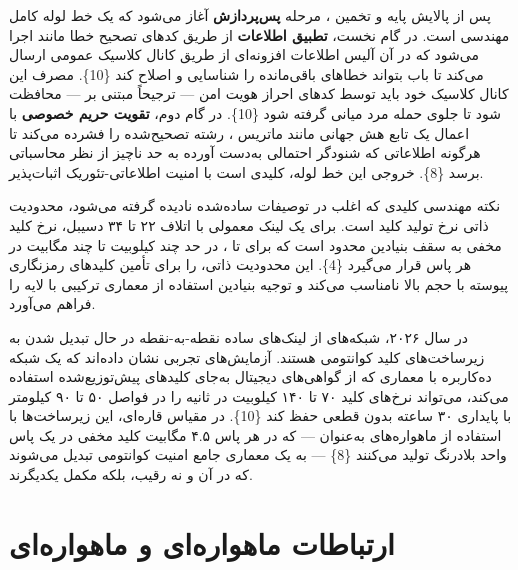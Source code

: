 \documentclass[a4paper,14pt]{extreport}
\begin{document}
پس از پالایش پایه و تخمین ، مرحله \textbf{پس‌پردازش}  آغاز می‌شود که یک خط لوله کامل مهندسی است. در گام نخست، \textbf{تطبیق اطلاعات}  از طریق کدهای تصحیح خطا مانند  اجرا می‌شود که در آن آلیس اطلاعات افزونه‌ای  از طریق کانال کلاسیک عمومی ارسال می‌کند تا باب بتواند خطاهای باقی‌مانده را شناسایی و اصلاح کند \{10\}. مصرف این کانال کلاسیک خود باید توسط کدهای احراز هویت امن --- ترجیحاً مبتنی بر  --- محافظت شود تا جلوی حمله مرد میانی  گرفته شود \{10\}. در گام دوم، \textbf{تقویت حریم خصوصی}  با اعمال یک تابع هش جهانی  مانند ماتریس ، رشته تصحیح‌شده را فشرده می‌کند تا هرگونه اطلاعاتی که شنودگر احتمالی به‌دست آورده به حد ناچیز از نظر محاسباتی برسد \{8\}. خروجی این خط لوله، کلیدی است با امنیت اطلاعاتی-تئوریک اثبات‌پذیر.

نکته مهندسی کلیدی که اغلب در توصیفات ساده‌شده نادیده گرفته می‌شود، محدودیت ذاتی نرخ تولید کلید  است. برای یک لینک  معمولی با اتلاف ۲۲ تا ۳۴ دسیبل، نرخ کلید مخفی به سقف بنیادین  محدود است که برای  تا ، در حد چند کیلوبیت تا چند مگابیت در هر پاس قرار می‌گیرد \{4\}. این محدودیت ذاتی،  را برای تأمین کلیدهای رمزنگاری پیوسته با حجم بالا نامناسب می‌کند و توجیه بنیادین استفاده از معماری ترکیبی با لایه  را فراهم می‌آورد.

در سال ۲۰۲۶، شبکه‌های  از لینک‌های ساده نقطه-به-نقطه در حال تبدیل شدن به زیرساخت‌های کلید کوانتومی  هستند. آزمایش‌های تجربی نشان داده‌اند که یک شبکه ده‌کاربره با معماری  که از گواهی‌های دیجیتال  به‌جای کلیدهای پیش‌توزیع‌شده استفاده می‌کند، می‌تواند نرخ‌های کلید ۷۰ تا ۱۴۰ کیلوبیت در ثانیه را در فواصل ۵۰ تا ۹۰ کیلومتر با پایداری ۳۰ ساعته بدون قطعی حفظ کند \{10\}. در مقیاس قاره‌ای، این زیرساخت‌ها با استفاده از ماهواره‌های  به‌عنوان  --- که در هر پاس ۴.۵ مگابیت کلید مخفی در یک پاس واحد بلادرنگ تولید می‌کنند \{8\} --- به یک معماری جامع امنیت کوانتومی تبدیل می‌شوند که در آن  و  نه رقیب، بلکه مکمل یکدیگرند.

\section{ارتباطات ماهواره‌ای و  ماهواره‌ای}
\end{document}
